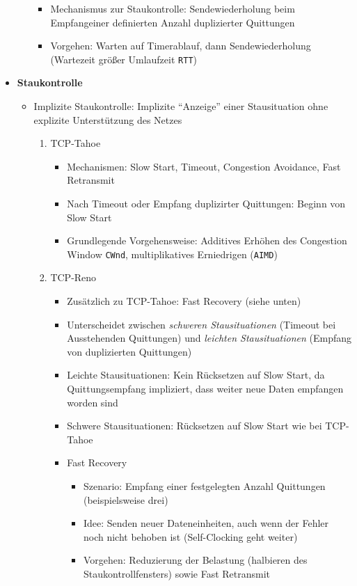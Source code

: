 \begin{itemize}
\begin{itemize}
\begin{itemize}
			\item Mechanismus zur Staukontrolle: Sendewiederholung beim Empfangeiner definierten Anzahl duplizierter Quittungen
			\item Vorgehen: Warten auf Timerablauf, dann Sendewiederholung (Wartezeit größer Umlaufzeit \texttt{RTT})
		\end{itemize}
	\end{itemize}
	\item \textbf{Staukontrolle}
	\begin{itemize}
		\item Implizite Staukontrolle: Implizite "`Anzeige"' einer Stausituation ohne explizite Unterstützung des Netzes
		\begin{enumerate}
			\item TCP-Tahoe
			\begin{itemize}
				\item Mechanismen: Slow Start, Timeout, Congestion Avoidance, Fast Retransmit
				\item Nach Timeout oder Empfang duplizirter Quittungen: Beginn von Slow Start
				\item Grundlegende Vorgehensweise: Additives Erhöhen des Congestion Window \texttt{CWnd}, multiplikatives Erniedrigen (\texttt{AIMD})
			\end{itemize}
			\item TCP-Reno
			\begin{itemize}
				\item Zusätzlich zu TCP-Tahoe: Fast Recovery (siehe unten)
				\item Unterscheidet zwischen \textit{schweren Stausituationen} (Timeout bei Ausstehenden Quittungen) und \textit{leichten Stausituationen} (Empfang von duplizierten Quittungen)
				\item Leichte Stausituationen: Kein Rücksetzen auf Slow Start, da Quittungsempfang impliziert, dass weiter neue Daten empfangen worden sind
				\item Schwere Stausituationen: Rücksetzen auf Slow Start wie bei TCP-Tahoe
				\item Fast Recovery
				\begin{itemize}
					\item Szenario: Empfang einer festgelegten Anzahl Quittungen (beispielsweise drei)
					\item Idee: Senden neuer Dateneinheiten, auch wenn der Fehler noch nicht behoben ist (Self-Clocking geht weiter)
					\item Vorgehen: Reduzierung der Belastung (halbieren des Staukontrollfensters) sowie Fast Retransmit

\end{itemize}
\end{itemize}
\end{enumerate}
\end{itemize}
\end{itemize}
